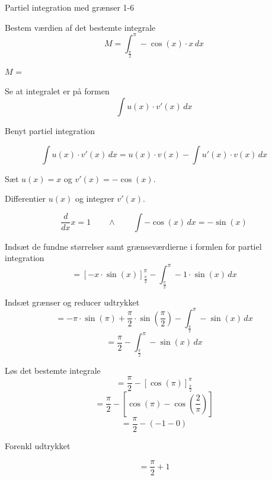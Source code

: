 \documentclass{article}
\begin{document}
\begin{exercise}{Partiel integration med grænser 1-6}
	
	
	Bestem værdien af det bestemte integrale
	\[
	M = \int_{\frac{\pi}{2}}^\pi - \cos(x) \cdot x \, dx
	\]
	
	$M$ =  
	
	
	\hint
	
	Se at integralet er på formen
	\[
	\int u(x) \cdot v'(x) \, dx
	\]
	
	\hint
	
	Benyt partiel integration
	
	\hint
	\[
	\int u(x) \cdot v'(x)\, dx = u(x) \cdot v(x) - \int u'(x) \cdot v(x) \, dx
	\]
	\hint
	
	Sæt $u(x) = x$ og $v'(x) = - \cos(x)$.
	
	
	\hint
	
	Differentier $u(x)$ og integrer $v'(x)$.
	
	\hint
	\[
	\frac{d}{dx}x = 1 \qquad \wedge \qquad \int -\cos(x) \, dx = - \sin(x)
	\]
	
	\hint
	
	Indsæt de fundne størrelser samt grænseværdierne i formlen for partiel integration 
	\[
	= \left[-x \cdot \sin(x) \right]_{\frac{\pi}{2}}^{\pi} - \int_{\frac{\pi}{2}}^{\pi} -1 \cdot \sin(x)  \, dx
	\]
	
	\hint
	
	Indsæt grænser og reducer udtrykket
	\[
	= - \pi \cdot \sin(\pi) + \frac{\pi}{2} \cdot \sin\left(\frac{\pi}{2}\right)  - \int_{\frac{\pi}{2}}^{\pi} -\sin(x) \, dx
	\]
	\[
	= \frac{\pi}{2}- \int_{\frac{\pi}{2}}^{\pi} -\sin(x) \, dx
	\]
	
	\hint
	Løs det bestemte integrale
	\[
	= \frac{\pi}{2} - 	\left[ \cos(\pi) \right]_{\frac{\pi}{2}}^{\pi}
	\]
	\[
	= \frac{\pi}{2} - \left[ \cos(\pi) - \cos\left(\frac{2}{\pi}\right) \right] 
	\]
	\[
	=  \frac{\pi}{2} - (-1 - 0)
	\]
	
	\hint
	Forenkl udtrykket
	
	\hint
	\[
	= \frac{\pi}{2} + 1
	\]
	
	
	
\end{exercise}

\newpage
\end{document}

